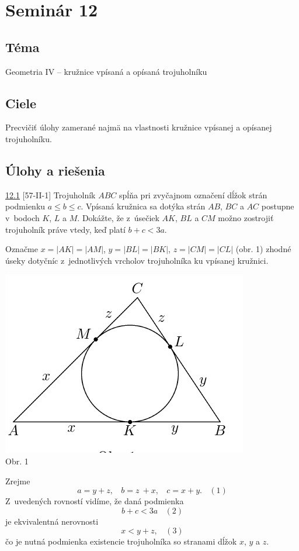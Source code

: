 \section*{Seminár 12}
\subsection*{Téma}
Geometria IV -- kružnice vpísaná a opísaná trojuholníku

\subsection*{Ciele}
Precvičiť úlohy zamerané najmä na vlastnosti kružnice vpísanej a opísanej trojuholníku.

\subsection*{Úlohy a riešenia}
\begin{tcolorbox}[breakable,notitle,boxrule=0pt,colback=light-gray,colframe=light-gray]\ul{12.1} [57-II-1] Trojuholník $ABC$ spĺňa pri zvyčajnom označení dĺžok strán podmienku $a \leq b \leq c$. Vpísaná kružnica sa dotýka strán $AB$, $BC$ a $AC$ postupne v~bodoch $K$, $L$ a $M$. Dokážte, že z~úsečiek $AK$, $BL$ a $CM$ možno zostrojiť trojuholník práve vtedy, keď platí $b + c < 3a$.

\end{tcolorbox}

\rieh Označme $x = |AK| = |AM|$, $y = |BL| = |BK|$, $z = |CM| = |CL|$ (obr. 1) zhodné úseky dotyčníc z~jednotlivých vrcholov trojuholníka ku vpísanej kružnici.
\begin{center}
\includegraphics{obrazky/57K1}\\

Obr. 1
\end{center}
Zrejme
$$a= y + z, \ \ \ \ b = z~+ x, \ \ \ \ c = x + y. \ \ \ \ (1)$$
Z~uvedených rovností vidíme, že daná podmienka
$$b + c < 3a \ \ \ \ (2)$$
je ekvivalentná nerovnosti
$$x < y + z, \ \ \ \ (3)$$
čo je nutná podmienka existencie trojuholníka so stranami dĺžok $x$, $y$ a $z$.


